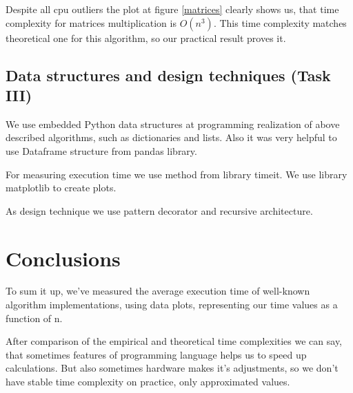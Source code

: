 \documentclass[a4paper,article,14pt]{extarticle}
\begin{document}
	Despite all cpu outliers the plot at figure \ref{matrices} clearly shows us, that time complexity for matrices multiplication is $O(n^3)$. This time complexity matches theoretical one for this algorithm, so our practical result proves it.
	
	\subsection{Data structures and design techniques (Task III)}
	
	We use embedded Python data structures at programming realization of above described algorithms, such as dictionaries and lists. Also it was very helpful to use Dataframe structure from \flqq pandas\frqq $ $ library.
	
	For measuring execution time we use method from library \flqq timeit\frqq. We use library \flqq matplotlib\frqq $ $ to create plots.
	
	As design technique we use pattern decorator and recursive architecture.
	
	
	\section{Conclusions}
	To sum it up, we've measured the average execution time of well-known algorithm implementations, using data plots, representing our time values as a function of n. 
	
	After comparison of the empirical and theoretical time complexities we can say, that sometimes features of programming language helps us to speed up calculations. But also sometimes hardware makes it's adjustments, so we don't have stable time complexity on practice, only approximated values. 
	
	\newpage
\end{document}
